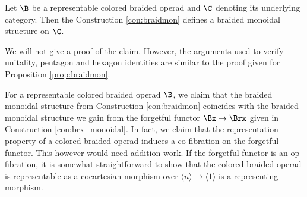 \begin{cla}
    Let $\B$ be a representable colored braided operad and $\C$ denoting its
    underlying category. Then the Construction \ref{con:braidmon} defines a
    braided monoidal structure on $\C$.
\end{cla}

We will not give a proof of the claim. However, the arguments used to verify
unitality, pentagon and hexagon identities are similar to the proof given for
Proposition \ref{prop:braidmon}.

For a representable colored braided operad $\B$, we claim that the braided
monoidal structure from Construction \ref{con:braidmon} coincides with the
braided monoidal structure we gain from the forgetful functor $\Bx \to \Brx$
given in Construction \ref{con:brx_monoidal}. In fact, we claim that the
representation property of a colored braided operad induces a co-fibration on the
forgetful functor. This however would need addition work. If the forgetful functor
is an op-fibration, it is somewhat straightforward to show that the colored braided operad is representable
as a cocartesian morphism over $\langle n \rangle \to \langle 1 \rangle$
is a representing morphism.




